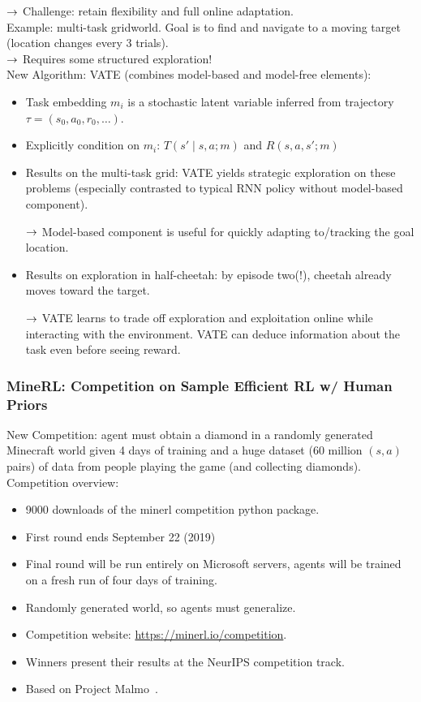$\rightarrow$ Challenge: retain flexibility and full online adaptation. \\

Example: multi-task gridworld. Goal is to find and navigate to a moving target (location changes every 3 trials). \\

$\rightarrow$ Requires some structured exploration! \\

New Algorithm: VATE (combines model-based and model-free elements):
\begin{itemize}
    \item Task embedding $m_i$ is a stochastic latent variable inferred from trajectory $\tau = (s_0, a_0, r_0, \ldots)$.
    \item Explicitly condition on $m_i$: $T(s' \mid s,a;m)$ and $R(s,a,s';m)$
    \item Results on the multi-task grid: VATE yields strategic exploration on these problems (especially contrasted to typical RNN policy without model-based component).
    
    $\rightarrow$ Model-based component is useful for quickly adapting to/tracking the goal location.
    \item Results on exploration in half-cheetah: by episode two(!), cheetah already moves toward the target.
    
    $\rightarrow$ VATE learns to trade off exploration and exploitation online while interacting with the environment. VATE can deduce information about the task even before seeing reward.
\end{itemize}




\subsubsection{MineRL: Competition on Sample Efficient RL w/ Human Priors}


New Competition: agent must obtain a diamond in a randomly generated Minecraft world given 4 days of training and a huge dataset (60 million $(s,a)$ pairs) of data from people playing the game (and collecting diamonds). \\

Competition overview:
\begin{itemize}
    \item 9000 downloads of the minerl competition python package.
    \item First round ends September 22 (2019)
    \item Final round will be run entirely on Microsoft servers, agents will be trained on a fresh run of four days of training. 
    \item Randomly generated world, so agents must generalize.
    \item Competition website: \url{https://minerl.io/competition}.
    \item Winners present their results at the NeurIPS competition track.
    \item Based on Project Malmo~\cite{johnson2016malmo}.
\end{itemize}


